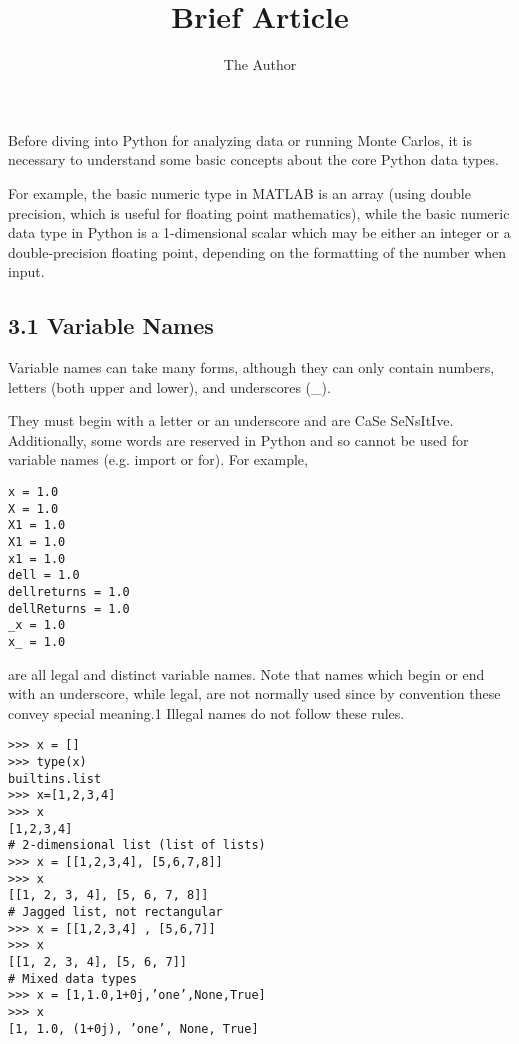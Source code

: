\documentclass[11pt]{article} %
\title{Brief Article}
\author{The Author}
\begin{document}
Before diving into Python for analyzing data or running Monte Carlos, it is necessary to understand some basic concepts about the core Python data types.


 For example,
the basic numeric type in MATLAB is an array (using double precision, which is useful for floating point
mathematics), while the basic numeric data type in Python is a 1-dimensional scalar which may be either
an integer or a double-precision floating point, depending on the formatting of the number when input.

\subsection{3.1 Variable Names}
Variable names can take many forms, although they can only contain numbers, letters (both upper and
lower), and underscores (\_). 

They must begin with a letter or an underscore and are CaSe SeNsItIve.
Additionally, some words are reserved in Python and so cannot be used for variable names (e.g. import or for). For example,

\begin{framed}
\begin{verbatim}
x = 1.0
X = 1.0
X1 = 1.0
X1 = 1.0
x1 = 1.0
dell = 1.0
dellreturns = 1.0
dellReturns = 1.0
_x = 1.0
x_ = 1.0
\end{verbatim}
\end{framed}

are all legal and distinct variable names. Note that names which begin or end with an underscore, while
legal, are not normally used since by convention these convey special meaning.1 Illegal names do not
follow these rules.
\newpage

\begin{framed}
\begin{verbatim}
>>> x = []
>>> type(x)
builtins.list
>>> x=[1,2,3,4]
>>> x
[1,2,3,4]
# 2-dimensional list (list of lists)
>>> x = [[1,2,3,4], [5,6,7,8]]
>>> x
[[1, 2, 3, 4], [5, 6, 7, 8]]
# Jagged list, not rectangular
>>> x = [[1,2,3,4] , [5,6,7]]
>>> x
[[1, 2, 3, 4], [5, 6, 7]]
# Mixed data types
>>> x = [1,1.0,1+0j,’one’,None,True]
>>> x
[1, 1.0, (1+0j), ’one’, None, True]

\end{verbatim}
\end{framed}

\end{document}

